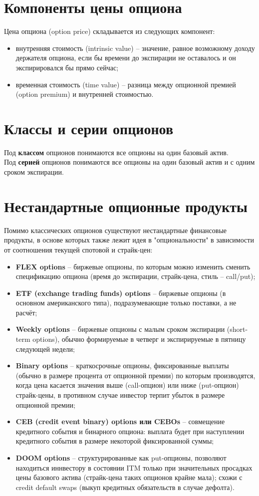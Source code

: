 \documentclass{article}
\begin{document}
\section{Компоненты цены опциона}
Цена опциона (option price) складывается из следующих компонент:
 \begin{itemize}
    \item внутренняя стоимость (intrinsic value) -- значение, равное возможному доходу держателя опциона, если бы времени до экспирации не оставалось и он экспирировался бы прямо сейчас;
    \item временная стоимость (time value) -- разница между опционной премией (option premium) и внутренней стоимостью.
\end{itemize}
\section{Классы и серии опционов}
Под \textbf{классом} опционов понимаются все опционы на один базовый актив.\\
Под \textbf{серией} опционов понимаются все опционы на один базовый актив и с одним сроком экспирации.\\
\section{Нестандартные опционные продукты}
Помимо классических опционов существуют нестандартные финансовые продукты, в основе которых также лежит идея в "опциональности" в зависимости от соотношения текущей спотовой и страйк-цен:
 \begin{itemize}
    \item \textbf{FLEX options} -- биржевые опционы, по которым можно изменить сменить спецификацию опциона (время до экспирации, страйк-цена, стиль -- call/put);
    \item \textbf{ETF (exchange trading funds) options} -- биржевые опционы (в основном американского типа), подразумевающие только поставки, а не расчёт;
    \item \textbf{Weekly options} -- биржевые опционы с малым сроком экспирации (short-term options), обычно формируемые в четверг и экспирируемые в пятницу следующей недели;
    \item \textbf{Binary options} -- краткосрочные опционы, фиксированные выплаты (обычно в размере процента от опционной премии) по которым производятся, когда цена касается значения выше (call-опцион) или ниже (put-опцион) страйк-цены, в противном случае инвестор терпит убыток в размере опционной премии;
    \item \textbf{CEB (credit event binary) options или CEBOs} -- совмещение кредитного события и бинарного опциона: выплата будет при наступлении кредитного события в размере некоторой фиксированной суммы;
    \item \textbf{DOOM options} -- структурированные как put-опционы, позволяют находиться иннвестору в состоянии ITM только при значительных просадках цены базового актива (страйк-цена таких опционов крайне мала); схожи с credit default swaps (выкуп кредитных обязательств в случае дефолта).
\end{itemize}
\end{document}
